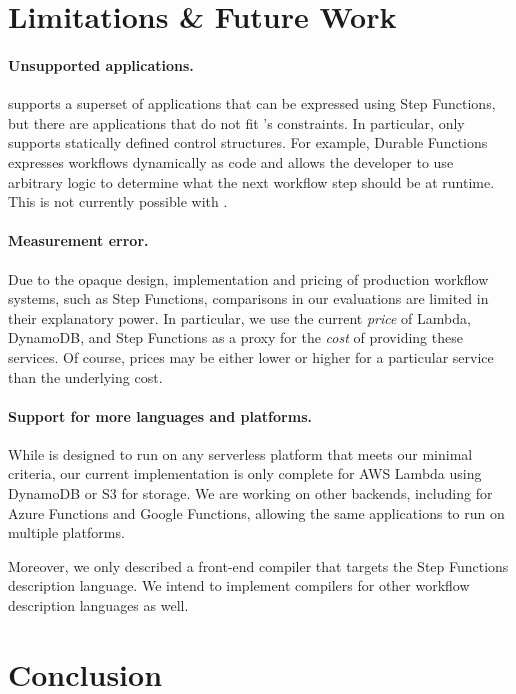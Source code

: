 \section{Limitations \& Future Work}\label{sec:limitations}

\paragraph{Unsupported applications.} \name{} supports a superset of
applications that can be expressed using Step Functions, but there are
applications that do not fit \name{}'s constraints. In particular, \name{} only
supports statically defined control structures. For example, Durable Functions
expresses workflows dynamically as code and allows the developer to use
arbitrary logic to determine what the next workflow step should be at runtime.
This is not currently possible with \name{}.

\paragraph{Measurement error.} Due to the opaque design, implementation and
pricing of production workflow systems, such as Step Functions, comparisons in
our evaluations are limited in their explanatory power. In particular, we use
the current \emph{price} of Lambda, DynamoDB, and Step Functions as a proxy for
the \emph{cost} of providing these services. Of course, prices may be either
lower or higher for a particular service than the underlying cost.

\paragraph{Support for more languages and platforms.} While \name{} is designed
to run on any serverless platform that meets our minimal criteria, our current
implementation is only complete for AWS Lambda using DynamoDB or S3 for storage.
We are working on other backends, including for Azure Functions and Google
Functions, allowing the same applications to run on multiple platforms.

Moreover, we only described a front-end compiler that targets the Step Functions
description language. We intend to implement compilers for other workflow
description languages as well.

\section{Conclusion}\label{sec:conclusion}

